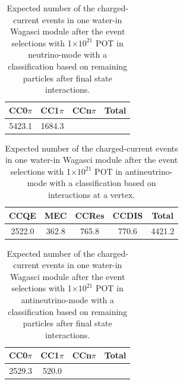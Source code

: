 \begin{table}[htb]
  \begin{center}
    \caption{Expected number of the charged-current events in one water-in Wagasci module after the event selections with 1$\times 10^{21}$ POT in neutrino-mode with a classification based on remaining particles after final state interactions.}
    \begin{tabular}{ccc|c} \hline
CC0$\pi$ & CC1$\pi$ & CCn$\pi$  & Total \\ \hline
5423.1 & 1684.3 &  & \\
\hline
    \end{tabular}
    \label{tab:expected_num_ccfsi_events_neutrino_beam}
  \end{center}
\end{table}

\begin{table}[htb]
  \begin{center}
    \caption{Expected number of the charged-current events in one water-in Wagasci module after the event selections with 1$\times 10^{21}$ POT in antineutrino-mode with a classification based on interactions at a vertex.}
    \begin{tabular}{cccc|c} \hline
CCQE & MEC & CCRes & CCDIS & Total \\ \hline
2522.0 & 362.8 & 765.8 & 770.6 & 4421.2 \\
\hline
    \end{tabular}
    \label{tab:expected_num_cc_events_antineutrino_beam}
  \end{center}
\end{table}

\begin{table}[htb]
  \begin{center}
    \caption{Expected number of the charged-current events in one water-in Wagasci module after the event selections with 1$\times 10^{21}$ POT in antineutrino-mode with a classification based on remaining particles after final state interactions.}
    \begin{tabular}{ccc|c} \hline
CC0$\pi$ & CC1$\pi$ & CCn$\pi$  & Total \\ \hline
2529.3 & 520.0 &  & \\
\hline
    \end{tabular}
    \label{tab:expected_num_ccfsi_events_antineutrino_beam}
  \end{center}
\end{table}


